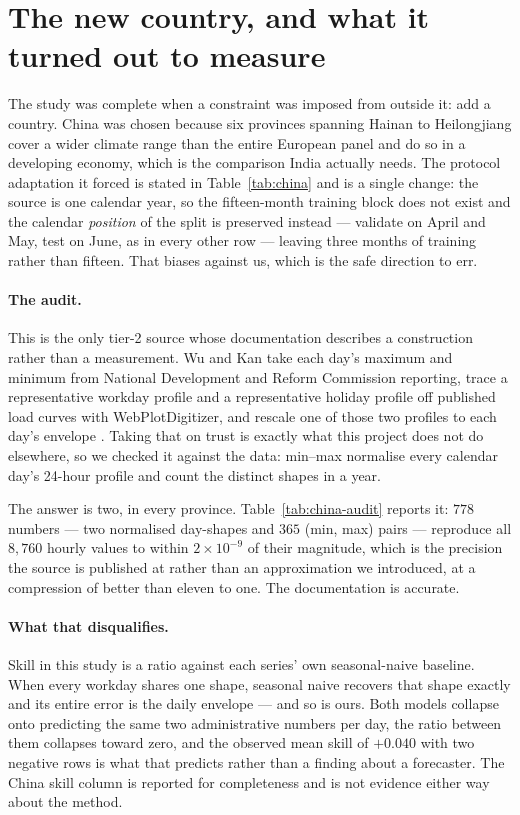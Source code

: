 \section{The new country, and what it turned out to measure}
\label{sec:china}

The study was complete when a constraint was imposed from outside it: add a
country. China was chosen because six provinces spanning Hainan to Heilongjiang
cover a wider climate range than the entire European panel and do so in a
developing economy, which is the comparison India actually needs. The protocol
adaptation it forced is stated in Table~\ref{tab:china} and is a single change:
the source is one calendar year, so the fifteen-month training block does not
exist and the calendar \emph{position} of the split is preserved instead ---
validate on April and May, test on June, as in every other row --- leaving three
months of training rather than fifteen. That biases against us, which is the safe
direction to err.



\paragraph{The audit.} This is the only tier-2 source whose documentation
describes a construction rather than a measurement. Wu and Kan take each day's
maximum and minimum from National Development and Reform Commission reporting,
trace a representative workday profile and a representative holiday profile off
published load curves with WebPlotDigitizer, and rescale one of those two
profiles to each day's envelope \citep{wu2023china}. Taking that on trust is
exactly what this project does not do elsewhere, so we checked it against the
data: min--max normalise every calendar day's 24-hour profile and count the
distinct shapes in a year.

The answer is two, in every province. Table~\ref{tab:china-audit} reports it:
$778$ numbers --- two normalised day-shapes and $365$ (min, max) pairs ---
reproduce all $8{,}760$ hourly values to within $2\times10^{-9}$ of their
magnitude, which is the precision the source is published at rather than an
approximation we introduced, at a compression of better than eleven to one. The
documentation is accurate.

\paragraph{What that disqualifies.} Skill in this study is a ratio against each
series' own seasonal-naive baseline. When every workday shares one shape,
seasonal naive recovers that shape exactly and its entire error is the daily
envelope --- and so is ours. Both models collapse onto predicting the same two
administrative numbers per day, the ratio between them collapses toward zero,
and the observed mean skill of $+0.040$ with two negative rows is what that
predicts rather than a finding about a forecaster. The China skill column is
reported for completeness and is not evidence either way about the method.

